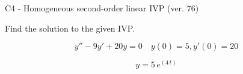 \begin{exercise}
  \begin{exerciseTitle}C4 - Homogeneous second-order linear IVP (ver. 76)\end{exerciseTitle}
  \begin{exerciseStatement}
    
Find the solution to the given IVP.

    
\[y''-9y'+20y = 0 \hspace{1em} y(0) = 5 , y'(0) = 20\]

  \end{exerciseStatement}
  \begin{exerciseAnswer}
    
\[y= 5 \, e^{\left(4 \, t\right)}\]

  \end{exerciseAnswer}
\end{exercise}